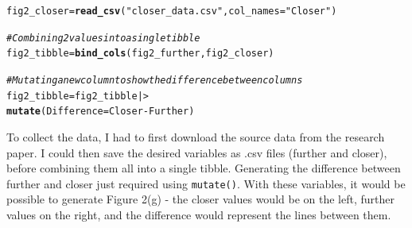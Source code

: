 \documentclass{article}\usepackage[]{graphicx}\usepackage[]{xcolor}
\makeatletter
\newcommand{\hlsng}[1]{\textcolor[rgb]{0.192,0.494,0.8}{#1}}%
\newcommand{\hlcom}[1]{\textcolor[rgb]{0.678,0.584,0.686}{\textit{#1}}}%
\newcommand{\hlopt}[1]{\textcolor[rgb]{0,0,0}{#1}}%
\newcommand{\hldef}[1]{\textcolor[rgb]{0.345,0.345,0.345}{#1}}%
\newcommand{\hlkwb}[1]{\textcolor[rgb]{0.69,0.353,0.396}{#1}}%
\newcommand{\hlkwc}[1]{\textcolor[rgb]{0.333,0.667,0.333}{#1}}%
\newcommand{\hlkwd}[1]{\textcolor[rgb]{0.737,0.353,0.396}{\textbf{#1}}}%
\newenvironment{kframe}{%
 \def\at@end@of@kframe{}%
 \ifinner\ifhmode%
  \def\at@end@of@kframe{\end{minipage}}%
  \begin{minipage}{\columnwidth}%
 \fi\fi%
 \def\FrameCommand##1{\hskip\@totalleftmargin \hskip-\fboxsep
 \colorbox{shadecolor}{##1}\hskip-\fboxsep
     \hskip-\linewidth \hskip-\@totalleftmargin \hskip\columnwidth}%
 \MakeFramed {\advance\hsize-\width
   \@totalleftmargin\z@ \linewidth\hsize
   \@setminipage}}%
 {\par\unskip\endMakeFramed%
 \at@end@of@kframe}
\newenvironment{knitrout}{}{} %
\makeatother
\begin{document}
\begin{enumerate}
\begin{knitrout}
\begin{kframe}
{\ttfamily\noindent\itshape{}}\begin{alltt}
\hldef{fig2_closer} \hlkwb{=} \hlkwd{read_csv}\hldef{(}\hlsng{"closer_data.csv"}\hldef{,} \hlkwc{col_names} \hldef{=} \hlsng{"Closer"}\hldef{)}
\end{alltt}


{\ttfamily\noindent\itshape{}}\begin{alltt}
\hlcom{#Combining 2 values into a single tibble}
\hldef{fig2_tibble} \hlkwb{=} \hlkwd{bind_cols}\hldef{(fig2_further, fig2_closer)}

\hlcom{#Mutating a new column to show the difference between columns}
\hldef{fig2_tibble} \hlkwb{=} \hldef{fig2_tibble |>}
  \hlkwd{mutate}\hldef{(}\hlkwc{Difference} \hldef{= Closer}\hlopt{-}\hldef{Further)}
\end{alltt}
\end{kframe}
\end{knitrout}
To collect the data, I had to first download the source data from the research paper. I could then save the desired variables as .csv files (further and closer), before combining them all into a single tibble. Generating the difference between further and closer just required using \texttt{mutate()}. With these variables, it would be possible to generate Figure 2(g) - the closer values would be on the left, further values on the right, and the difference would represent the lines between them.



\end{enumerate}
\end{document}
